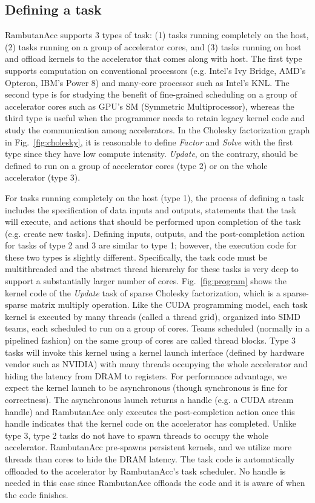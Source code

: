 \subsection{Defining a task}
\label{sec:task-def}
RambutanAcc supports 3 types of task: (1) tasks running completely on the host, (2) tasks running on a group of accelerator cores, and (3) tasks running on host and offload kernels to the accelerator that comes along with host.
The first type supports computation on conventional processors (e.g. Intel's Ivy Bridge, AMD's Opteron, IBM's Power 8)  and many-core processor such as Intel's KNL.
The second type is for studying the benefit of fine-grained scheduling on a group of accelerator cores such as GPU's SM (Symmetric Multiprocessor), whereas the third type is useful when the programmer needs to retain legacy kernel code and study the communication among accelerators.
In the Cholesky factorization graph in Fig.~\ref{fig:cholesky}, it is reasonable to define {\em Factor} and {\em Solve} with the first type since they have low compute intensity. 
{\em Update}, on the contrary, should be defined to run on a group of accelerator cores (type 2) or on the whole accelerator (type 3).

For tasks running completely on the host (type 1), the process of defining a task includes the specification of data inputs and outputs, statements that the task will execute, and actions that should be performed upon completion of the task (e.g. create new tasks).
Defining inputs, outputs, and the post-completion action for tasks of type 2 and 3 are similar to type 1; however, the execution code for these two types is slightly different.
Specifically, the task code must be multithreaded and the abstract thread hierarchy for these tasks is very deep to support a substantially larger number of cores.
Fig.~\ref{fig:program} shows the kernel code of the {\em Update} task of sparse Cholesky factorization, which is a sparse-sparse matrix multiply operation.
Like the CUDA programming model, each task kernel is executed by many threads (called a thread grid), organized into SIMD teams, each scheduled to run on a group of cores.
Teams scheduled (normally in a pipelined fashion) on the same group of cores are called thread blocks.
Type 3 tasks will invoke this kernel using a kernel launch interface (defined by hardware vendor such as NVIDIA) with many threads occupying the whole accelerator and hiding the latency from DRAM to registers.
For performance advantage, we expect the kernel launch to be asynchronous (though synchronous is fine for correctness).
The asynchronous launch returns a handle (e.g. a CUDA stream handle) and RambutanAcc only executes the post-completion action once this handle indicates that the kernel code on the accelerator has completed.
Unlike type 3, type 2 tasks do not have to spawn threads to occupy the whole accelerator.
RambutanAcc pre-spawns persistent kernels, and we utilize more threads than cores to hide the DRAM latency.
The task code is automatically offloaded to the accelerator by RambutanAcc's task scheduler.
No handle is needed in this case since RambutanAcc offloads the code and it is aware of when the code finishes.


